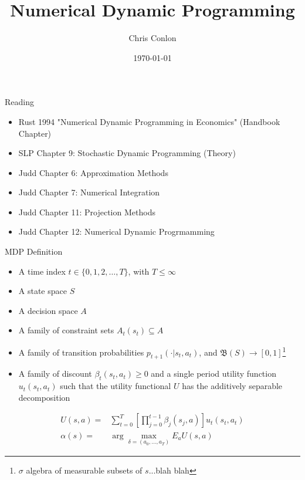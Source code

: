 \documentclass[aspectratio=169,11pt]{beamer}
\title [Single-agent dynamic optimization models]{Numerical Dynamic Programming}
\author{Chris Conlon  }
\institute{Grad IO}
\date{\today }
\begin{document}
\begin{frame}
\titlepage
\end{frame}

\begin{frame}{Reading}
\begin{itemize}
\item Rust 1994 "Numerical Dynamic Programming in Economics" (Handbook Chapter)
\item SLP Chapter 9: Stochastic Dynamic Programming (Theory)
\item Judd Chapter 6: Approximation Methods
\item Judd Chapter 7: Numerical Integration
\item Judd Chapter 11: Projection Methods
\item Judd Chapter 12: Numerical Dynamic Progrmamming
\end{itemize}
\end{frame}


\begin{frame}{MDP Definition}
\begin{itemize}
\item A time index $t \in\{0,1,2,\ldots,T\}$, with $T \leq \infty$
\item A state space $S$
\item A decision space $A$
\item A family of constraint sets $A_t(s_t) \subseteq A$
\item A family of transition probabilities $p_{t+1}(\cdot | s_t,a_t)$, and $\mathfrak{B}(S) \rightarrow [0,1]$\footnote{$\sigma$ algebra of measurable subsets of $s$...blah blah}
\item A family of discount $\beta_t(s_t,a_t ) \geq 0$ and a single period utility function $u_t(s_t,a_t)$ such that the utility functional $U$ has the additively separable decomposition
\end{itemize}
\begin{eqnarray*}
U(s,a) = &\sum_{t=0}^T \left [ \prod_{j=0}^{t-1} \beta_j (s_j,a) \right] u_t(s_t,a_t) \\
\alpha(s) =&\arg \max_{\delta=(a_0,\ldots,a_T)} E_{a} U(s,a)
\end{eqnarray*}
\end{frame}
\end{document}
